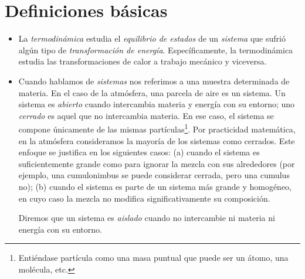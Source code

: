 \documentclass[openany]{book}
\begin{document}
\section{Definiciones básicas}
\begin{itemize}
	\item La {\em termodinámica} estudia el {\em equilibrio de estados} de un {\em sistema} que sufrió algún tipo de {\em transformación de energía}. Específicamente, la termodinámica estudia las transformaciones de calor a trabajo mecánico y viceversa.
	\item Cuando hablamos de {\em sistemas} nos referimos a una muestra determinada de materia. En el caso de la atmósfera, una parcela de aire es un sistema. Un sistema es \emph{abierto} cuando intercambia materia y energía con su entorno; uno \emph{cerrado} es aquel que no intercambia materia. En ese caso, el sistema se compone únicamente de las mismas partículas\footnote{Entiéndase partícula como una masa puntual que puede ser un átomo, una molécula, etc.}. Por practicidad matemática, en la atmósfera consideramos la mayoría de los sistemas como cerrados. Este enfoque se justifica en los siguientes casos: (a) cuando el sistema es suficientemente grande como para ignorar la mezcla con sus alrededores (por ejemplo, una cumulonimbus se puede considerar cerrada, pero una cumulus no); (b) cuando el sistema es parte de un sistema más grande y homogéneo, en cuyo caso la mezcla no modifica significativamente su composición.\par Diremos que un sistema es \emph{aislado} cuando no intercambie ni materia ni energía con su entorno.

\end{itemize}
\end{document}
